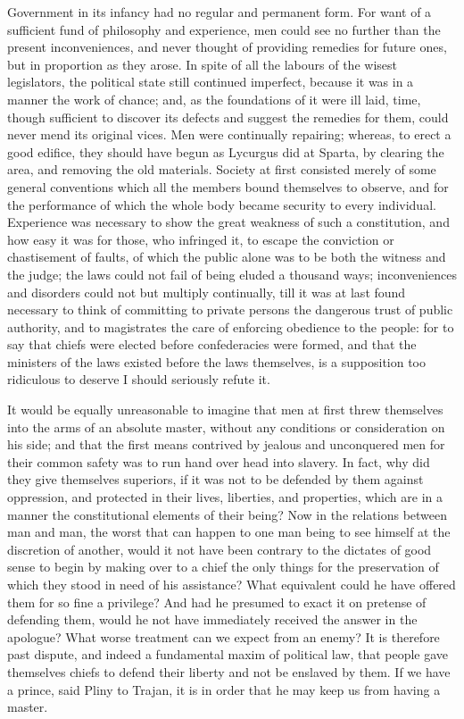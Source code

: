 \documentclass[11pt,twocolumn]{ltugboat}
\begin{document}
Government in its infancy had no regular and permanent form. For want
of a sufficient fund of philosophy and experience, men could see no
further than the present inconveniences, and never thought of
providing remedies for future ones, but in proportion as they arose.
In spite of all the labours of the wisest legislators, the political
state still continued imperfect, because it was in a manner the work
of chance; and, as the foundations of it were ill laid, time, though
sufficient to discover its defects and suggest the remedies for them,
could never mend its original vices. Men were continually repairing;
whereas, to erect a good edifice, they should have begun as Lycurgus
did at Sparta, by clearing the area, and removing the old materials.
Society at first consisted merely of some general conventions which
all the members bound themselves to observe, and for the performance
of which the whole body became security to every individual.
Experience was necessary to show the great weakness of such a
constitution, and how easy it was for those, who infringed it, to
escape the conviction or chastisement of faults, of which the public
alone was to be both the witness and the judge; the laws could not
fail of being eluded a thousand ways; inconveniences and disorders
could not but multiply continually, till it was at last found
necessary to think of committing to private persons the dangerous
trust of public authority, and to magistrates the care of enforcing
obedience to the people: for to say that chiefs were elected before
confederacies were formed, and that the ministers of the laws existed
before the laws themselves, is a supposition too ridiculous to deserve
I should seriously refute it.

It would be equally unreasonable to imagine that men at first threw
themselves into the arms of an absolute master, without any conditions
or consideration on his side; and that the first means contrived by
jealous and unconquered men for their common safety was to run hand
over head into slavery. In fact, why did they give themselves
superiors, if it was not to be defended by them against oppression,
and protected in their lives, liberties, and properties, which are in
a manner the constitutional elements of their being? Now in the
relations between man and man, the worst that can happen to one man
being to see himself at the discretion of another, would it not have
been contrary to the dictates of good sense to begin by making over to
a chief the only things for the preservation of which they stood in
need of his assistance? What equivalent could he have offered them
for so fine a privilege? And had he presumed to exact it on pretense
of defending them, would he not have immediately received the answer
in the apologue? What worse treatment can we expect from an enemy? It
is therefore past dispute, and indeed a fundamental maxim of political
law, that people gave themselves chiefs to defend their liberty and
not be enslaved by them. If we have a prince, said Pliny to Trajan, it
is in order that he may keep us from having a master.
\end{document}
